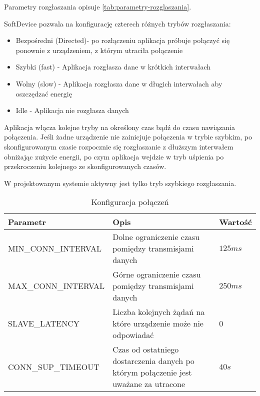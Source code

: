Parametry rozgłaszania opisuje \ref{tab:parametry-rozglaszania}.

SoftDevice pozwala na konfigurację czterech różnych trybów rozgłaszania:

\begin{itemize}

\item Bezpośredni (Directed)- po rozłączeniu aplikacja próbuje połączyć się
ponownie z urządzeniem, z którym utraciła połączenie

\item Szybki (fast) - Aplikacja rozgłasza dane w krótkich interwałach

\item Wolny (slow) - Aplikacja rozgłasza dane w długich interwałach aby
oszczędzać energię

\item Idle - Aplikacja nie rozgłasza danych

\end{itemize}

Aplikacja włącza kolejne tryby na określony czas bądź do czasu nawiązania
połączenia. Jeśli żadne urządzenie nie zainicjuje połączenia w trybie szybkim,
po skonfigurowanym czasie rozpocznie się rozgłaszanie z dłuższym interwałem
obniżając zużycie energii, po czym aplikacja wejdzie w tryb uśpienia po
przekroczeniu kolejnego ze skonfigurowanych czasów.

W projektowanym systemie aktywny jest tylko tryb szybkiego rozgłaszania.

\begin{table}[t]

\begin{tabularx}{\linewidth}{|l|X|l|}

\hline Parametr & Opis & Wartość \\

\hline MIN\_CONN\_INTERVAL & Dolne ograniczenie czasu pomiędzy transmisjami
danych & $125ms$ \\

\hline MAX\_CONN\_INTERVAL & Górne ograniczenie czasu pomiędzy transmisjami
danych & $250ms$ \\

\hline SLAVE\_LATENCY & Liczba kolejnych żądań na które urządzenie może nie
odpowiadać & 0 \\

\hline CONN\_SUP\_TIMEOUT & Czas od ostatniego dostarczenia danych po którym
połączenie jest uważane za utracone & $40s$ \\

\hline \end{tabularx}

\caption{Konfiguracja połączeń}

\label{tab:parametry-polaczenia}

\end{table}

